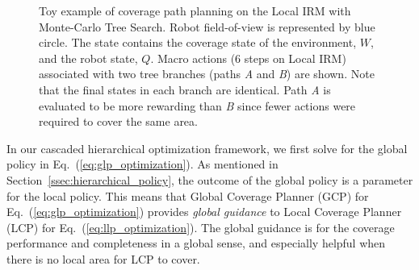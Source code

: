 \documentclass[letterpaper]{article} %
\newcommand{\phdone}[1]{} %
\begin{document}
\begin{figure}[h!]
  \caption{Toy example of coverage path planning on the Local IRM with Monte-Carlo Tree Search. Robot field-of-view is represented by blue circle. The state contains the coverage state of the environment, $W$, and the robot state, $Q$. Macro actions (6 steps on Local IRM) associated with two tree branches (paths \textit{A} and \textit{B}) are shown. Note that the final states in each branch are identical. Path \textit{A} is evaluated to be more rewarding than \textit{B} since fewer actions were required to cover the same area.}
  \label{fig:lattice-level-planner}
\end{figure}








\phdone{GCP Functionality}
In our cascaded hierarchical optimization framework, we first solve for the global policy in Eq.~(\ref{eq:glp_optimization}).
As mentioned in Section~\ref{ssec:hierarchical_policy}, the outcome of the global policy is a parameter for the local policy.
This means that Global Coverage Planner (GCP) for Eq.~(\ref{eq:glp_optimization}) provides \textit{global guidance} to Local Coverage Planner (LCP) for Eq.~(\ref{eq:llp_optimization}).
The global guidance is for the coverage performance and completeness in a global sense, and especially helpful when there is no local area for LCP to cover.
\end{document}
